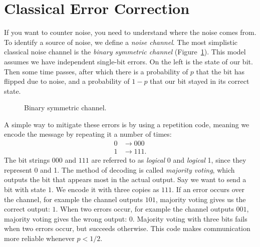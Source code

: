 \documentclass[11pt, notitlepage]{report}
\begin{document}
\section{Classical Error Correction}
If you want to counter noise, you need to understand where the noise comes from. To identify a source of noise, we define a \emph{noise channel}. The most simplistic classical noise channel is the \emph{binary symmetric channel} (Figure~\ref{fig:binary_symmetric_channel}). This model assumes we have independent single-bit errors. On the left is the state of our bit. Then some time passes, after which there is a probability of $p$ that the bit has flipped due to noise, and a probability of $1 - p$ that our bit stayed in its correct state. 
\begin{figure}[ht]
  \centering
  \caption{Binary symmetric channel.}
  \label{fig:binary_symmetric_channel}
\end{figure}

A simple way to mitigate these errors is by using a repetition code, meaning we encode the message by repeating it a number of times:
\begin{align}
  0 &\rightarrow 000 \\
  1 &\rightarrow 111.
\end{align}
The bit strings $000$ and $111$ are referred to as \emph{logical} 0 and \emph{logical} 1, since they represent 0 and 1. The method of decoding is called \emph{majority voting}, which outputs the bit that appears most in the actual output. Say we want to send a bit with state $1$. We encode it with three copies as $111$. If an error occurs over the channel, for example the channel outputs $101$, majority voting gives us the correct output: $1$. When two errors occur, for example the channel outputs $001$, majority voting gives the wrong output: $0$. Majority voting with three bits fails when two errors occur, but succeeds otherwise. This code makes communication more reliable whenever $p < 1/2$.
\end{document}
